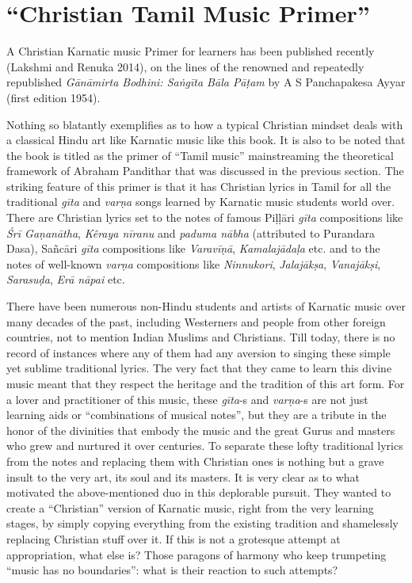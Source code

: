 \newpage

\section*{“Christian Tamil Music Primer”}

A Christian Karnatic music Primer for learners has been published recently (Lakshmi and Renuka 2014), on the lines of the renowned and repeatedly republished \textit{Gānāmirta Bodhini: Saṅgīta Bāla Pāṭam} by A S Panchapakesa Ayyar (first edition 1954).

Nothing so blatantly exemplifies as to how a typical Christian mindset deals with a classical Hindu art like Karnatic music like this book. It is also to be noted that the book is titled as the primer of “Tamil music” mainstreaming the theoretical framework of Abraham Pandithar that was discussed in the previous section. The striking feature of this primer is that it has Christian lyrics in Tamil for all the traditional \textit{gīta} and \textit{varṇa} songs learned by Karnatic music students world over. There are Christian lyrics set to the notes of famous Piḷḷāri \textit{gīta} compositions like \textit{Śrī Gaṇanātha}, \textit{Kêraya nīranu} and \textit{paduma nābha }(attributed to Purandara Dasa), Sañcāri \textit{gīta} compositions like \textit{Varavīṇā}, \textit{Kamalajādaḷa} etc. and to the notes of well-known \textit{varṇa} compositions like \textit{Ninnukori}, \textit{Jalajākṣa}, \textit{Vanajākṣi}, \textit{Sarasuḍa}, \textit{Erā nāpai} etc.

There have been numerous non-Hindu students and artists of Karnatic music over many decades of the past, including Westerners and people from other foreign countries, not to mention Indian Muslims and Christians. Till today, there is no record of instances where any of them had any aversion to singing these simple yet sublime traditional lyrics. The very fact that they came to learn this divine music meant that they respect the heritage and the tradition of this art form. For a lover and practitioner of this music, these \textit{gīta}-s and \textit{varṇa}-s are not just learning aids or “combinations of musical notes”, but they are a tribute in the honor of the divinities that embody the music and the great Gurus and masters who grew and nurtured it over centuries. To separate these lofty traditional lyrics from the notes and replacing them with Christian ones is nothing but a grave insult to the very art, its soul and its masters. It is very clear as to what motivated the above-mentioned duo in this deplorable pursuit. They wanted to create a “Christian” version of Karnatic music, right from the very learning stages, by simply copying everything from the existing tradition and shamelessly replacing Christian stuff over it. If this is not a grotesque attempt at appropriation, what else is? Those paragons of harmony who keep trumpeting “music has no boundaries”: what is their reaction to such attempts?


